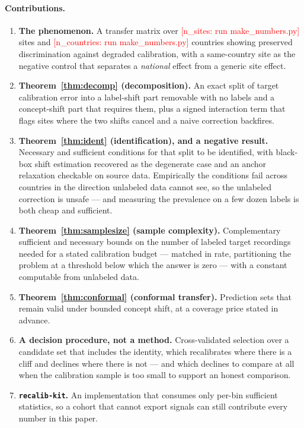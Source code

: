 \documentclass[11pt]{article}
\theoremstyle{plain}
\theoremstyle{definition}
\theoremstyle{remark}
\providecommand{\NUM}[1]{\textcolor{red}{[#1: run make\_numbers.py]}}}
\begin{document}
\paragraph{Contributions.}
\begin{enumerate}[leftmargin=*,itemsep=2pt]
\item \textbf{The phenomenon.}  A transfer matrix over
\NUM{n\_sites} sites and \NUM{n\_countries} countries showing preserved
discrimination against degraded calibration, with a same-country site as the
negative control that separates a \emph{national} effect from a generic
site effect.
\item \textbf{Theorem~\ref{thm:decomp} (decomposition).}  An exact split of
target calibration error into a label-shift part removable with no labels and a
concept-shift part that requires them, plus a signed interaction term that
flags sites where the two shifts cancel and a naive correction backfires.
\item \textbf{Theorem~\ref{thm:ident} (identification), and a negative result.}
Necessary and sufficient conditions for that split to be identified, with
black-box shift estimation recovered as the degenerate case and an anchor
relaxation checkable on source data.  Empirically the conditions fail across
countries in the direction unlabeled data cannot see, so the unlabeled
correction is unsafe --- and measuring the prevalence on a few dozen labels is
both cheap and sufficient.
\item \textbf{Theorem~\ref{thm:samplesize} (sample complexity).}  Complementary
sufficient and necessary bounds on the number of labeled target recordings
needed for a stated calibration budget --- matched in rate, partitioning the
problem at a threshold below which the answer is zero --- with a constant
computable from unlabeled data.
\item \textbf{Theorem~\ref{thm:conformal} (conformal transfer).}  Prediction
sets that remain valid under bounded concept shift, at a coverage price stated
in advance.
\item \textbf{A decision procedure, not a method.}  Cross-validated selection
over a candidate set that includes the identity, which recalibrates where there
is a cliff and declines where there is not --- and which declines to compare at
all when the calibration sample is too small to support an honest comparison.
\item \textbf{\texttt{recalib-kit}.}  An implementation that consumes only
per-bin sufficient statistics, so a cohort that cannot export signals can still
contribute every number in this paper.
\end{enumerate}
\end{document}
